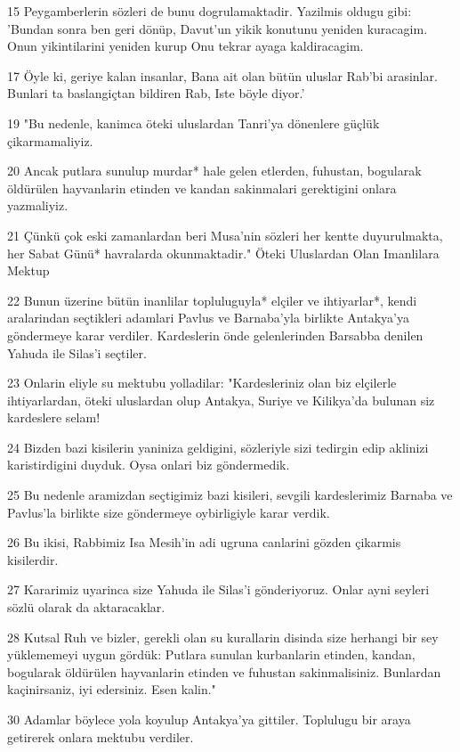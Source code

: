\par 15 Peygamberlerin sözleri de bunu dogrulamaktadir. Yazilmis oldugu gibi: 'Bundan sonra ben geri dönüp, Davut'un yikik konutunu yeniden kuracagim. Onun yikintilarini yeniden kurup Onu tekrar ayaga kaldiracagim.
\par 17 Öyle ki, geriye kalan insanlar, Bana ait olan bütün uluslar Rab'bi arasinlar. Bunlari ta baslangiçtan bildiren Rab, Iste böyle diyor.'
\par 19 "Bu nedenle, kanimca öteki uluslardan Tanri'ya dönenlere güçlük çikarmamaliyiz.
\par 20 Ancak putlara sunulup murdar* hale gelen etlerden, fuhustan, bogularak öldürülen hayvanlarin etinden ve kandan sakinmalari gerektigini onlara yazmaliyiz.
\par 21 Çünkü çok eski zamanlardan beri Musa'nin sözleri her kentte duyurulmakta, her Sabat Günü* havralarda okunmaktadir." Öteki Uluslardan Olan Imanlilara Mektup
\par 22 Bunun üzerine bütün inanlilar topluluguyla* elçiler ve ihtiyarlar*, kendi aralarindan seçtikleri adamlari Pavlus ve Barnaba'yla birlikte Antakya'ya göndermeye karar verdiler. Kardeslerin önde gelenlerinden Barsabba denilen Yahuda ile Silas'i seçtiler.
\par 23 Onlarin eliyle su mektubu yolladilar: "Kardesleriniz olan biz elçilerle ihtiyarlardan, öteki uluslardan olup Antakya, Suriye ve Kilikya'da bulunan siz kardeslere selam!
\par 24 Bizden bazi kisilerin yaniniza geldigini, sözleriyle sizi tedirgin edip aklinizi karistirdigini duyduk. Oysa onlari biz göndermedik.
\par 25 Bu nedenle aramizdan seçtigimiz bazi kisileri, sevgili kardeslerimiz Barnaba ve Pavlus'la birlikte size göndermeye oybirligiyle karar verdik.
\par 26 Bu ikisi, Rabbimiz Isa Mesih'in adi ugruna canlarini gözden çikarmis kisilerdir.
\par 27 Kararimiz uyarinca size Yahuda ile Silas'i gönderiyoruz. Onlar ayni seyleri sözlü olarak da aktaracaklar.
\par 28 Kutsal Ruh ve bizler, gerekli olan su kurallarin disinda size herhangi bir sey yüklememeyi uygun gördük: Putlara sunulan kurbanlarin etinden, kandan, bogularak öldürülen hayvanlarin etinden ve fuhustan sakinmalisiniz. Bunlardan kaçinirsaniz, iyi edersiniz. Esen kalin."
\par 30 Adamlar böylece yola koyulup Antakya'ya gittiler. Toplulugu bir araya getirerek onlara mektubu verdiler.
